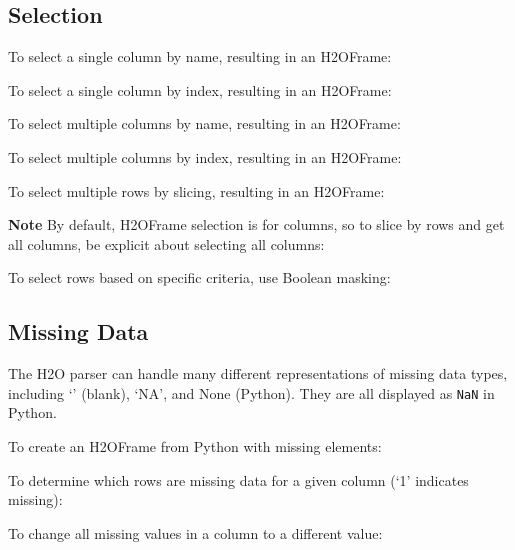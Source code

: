 {


\subsection{Selection}
To select a single column by name, resulting in an H2OFrame:


To select a single column by index, resulting in an H2OFrame:


\newpage
To select multiple columns by name, resulting in an H2OFrame:


To select multiple columns by index, resulting in an H2OFrame:


\newpage
To select multiple rows by slicing, resulting in an H2OFrame: 

\textbf{Note} By default, H2OFrame selection is for columns, so to slice by rows
and get all columns, be explicit about selecting all columns:


To select rows based on specific criteria, use Boolean masking:



\subsection{Missing Data}
The H2O parser can handle many different representations of missing data types, including `' (blank),
`NA',  and None (Python).  They are all displayed as \texttt{NaN} in Python.

To create an H2OFrame from Python with missing elements:


To determine which rows are missing data for a given column (`1' indicates missing):


To change all missing values in a column to a different value:


}

